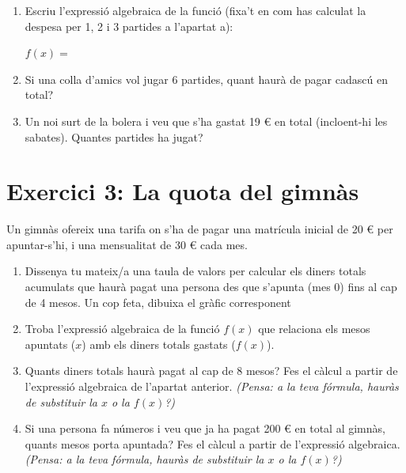 \documentclass[12pt,a4paper]{article}
\begin{document}
\begin{enumerate}[label=\alph*)]
    \vspace{0.5cm}
    \item Escriu l'expressió algebraica de la funció (fixa't en com has calculat la despesa per 1, 2 i 3 partides a l'apartat a):
    
    \vspace{0.5cm}
    $f(x) = $ 
    \vspace{0.5cm}
    
    \item Si una colla d'amics vol jugar 6 partides, quant haurà de pagar cadascú en total?
    \vspace{1cm}
    
    \item Un noi surt de la bolera i veu que s'ha gastat 19 € en total (incloent-hi les sabates). Quantes partides ha jugat?
    \vspace{1cm}
\end{enumerate}

\section*{Exercici 3: La quota del gimnàs}
Un gimnàs ofereix una tarifa on s'ha de pagar una matrícula inicial de 20 € per apuntar-s'hi, i una mensualitat de 30 € cada mes.

\begin{enumerate}[label=\alph*)]
    \item Dissenya tu mateix/a una taula de valors per calcular els diners totals acumulats que haurà pagat una persona des que s'apunta (mes 0) fins al cap de 4 mesos. Un cop feta, dibuixa el gràfic corresponent 
    \vspace{10cm} %
    \newpage
    \item Troba l'expressió algebraica de la funció $f(x)$ que relaciona els mesos apuntats ($x$) amb els diners totals gastats ($f(x)$).
    \vspace{1cm}
    
    \item Quants diners totals haurà pagat al cap de 8 mesos? Fes el càlcul a partir de l'expressió algebraica de l'apartat anterior. \textit{(Pensa: a la teva fórmula, hauràs de substituir la $x$ o la $f(x)$?)}
    \vspace{1cm}
    
    \item Si una persona fa números i veu que ja ha pagat 200 € en total al gimnàs, quants mesos porta apuntada? Fes el càlcul a partir de l'expressió algebraica. \textit{(Pensa: a la teva fórmula, hauràs de substituir la $x$ o la $f(x)$?)}
    \vspace{0.5cm}
\end{enumerate}
\end{document}
